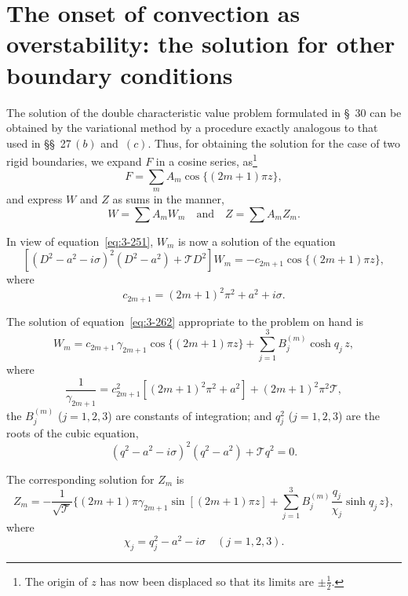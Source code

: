 \section{The onset of convection as overstability: the solution for other boundary conditions}\label{sec:3-31}

The solution of the double characteristic value problem formulated in \S~30 can be obtained by the variational method by a procedure exactly analogous to that used in \S\S~27\,$(b)$ and~$(c)$. Thus, for obtaining the solution for the case of two rigid boundaries, we expand $F$ in a cosine series, as\footnote{The origin of $z$ has now been displaced so that its limits are $\pm\frac{1}{2}$.}
\begin{equation}\label{eq:3-260}
F = \sum_m A_m \cos\{(2m+1)\pi z\},
\end{equation}
and express $W$ and $Z$ as sums in the manner,
\begin{equation}\label{eq:3-261}
W = \sum A_m W_m \quad \text{and} \quad Z = \sum A_m Z_m.
\end{equation}

In view of equation~\eqref{eq:3-251}, $W_m$ is now a solution of the equation
\begin{equation}\label{eq:3-262}
[(D^2 - a^2 - i\sigma)^2(D^2 - a^2) + \mathscr{T} D^2] W_m = -c_{2m+1} \cos\{(2m+1)\pi z\},
\end{equation}
where
\begin{equation}\label{eq:3-263}
c_{2m+1} = (2m+1)^2\pi^2 + a^2 + i\sigma.
\end{equation}

The solution of equation~\eqref{eq:3-262} appropriate to the problem on hand is
\begin{equation}\label{eq:3-264}
W_m = c_{2m+1}\,\gamma_{2m+1}\cos\{(2m+1)\pi z\} + \sum_{j=1}^{3} B_j^{(m)} \cosh q_j\,z,
\end{equation}
where
\begin{equation}\label{eq:3-265}
\frac{1}{\gamma_{2m+1}} = c_{2m+1}^2[(2m+1)^2\pi^2 + a^2] + (2m+1)^2\pi^2\mathscr{T},
\end{equation}
the $B_j^{(m)}$ ($j = 1, 2, 3$) are constants of integration; and $q_j^2$ ($j = 1, 2, 3$) are the roots of the cubic equation,
\begin{equation}\label{eq:3-266}
(q^2 - a^2 - i\sigma)^2(q^2 - a^2) + \mathscr{T} q^2 = 0.
\end{equation}

The corresponding solution for $Z_m$ is
\begin{equation}\label{eq:3-267}
Z_m = -\frac{1}{\sqrt{\mathscr{T}}}\bigg\{(2m+1)\pi\gamma_{2m+1}\sin[(2m+1)\pi z] + \sum_{j=1}^{3}B_j^{(m)}\frac{q_j}{\chi_j}\sinh q_j\,z\bigg\},
\end{equation}
where
\begin{equation}\label{eq:3-268}
\chi_j = q_j^2 - a^2 - i\sigma \quad (j = 1, 2, 3).
\end{equation}

